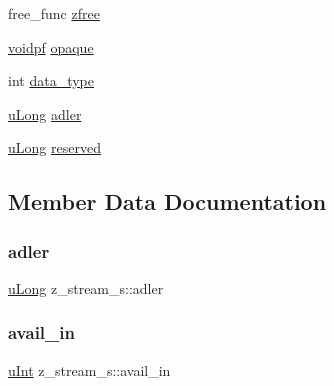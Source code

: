 \begin{DoxyCompactItemize}
\item 
free\+\_\+func \mbox{\hyperlink{structz__stream__s_a89eb750ade7f4f0b56bfdadf13344982}{zfree}}
\item 
\mbox{\hyperlink{ZlibCrc32_8h_a04c731495379021454c8e61439dc88ec}{voidpf}} \mbox{\hyperlink{structz__stream__s_ab72467f908d2ce65d5b42ee6556ef8bb}{opaque}}
\item 
int \mbox{\hyperlink{structz__stream__s_a9d8f63877d7639a8bca60f9fc3704fc4}{data\+\_\+type}}
\item 
\mbox{\hyperlink{ZlibCrc32_8h_acd2a5701a3aecf6700d2c66c606ecb40}{u\+Long}} \mbox{\hyperlink{structz__stream__s_ade2217fe31e671be1257731883201223}{adler}}
\item 
\mbox{\hyperlink{ZlibCrc32_8h_acd2a5701a3aecf6700d2c66c606ecb40}{u\+Long}} \mbox{\hyperlink{structz__stream__s_add73791dd19b49c9c68f3f3d328c37db}{reserved}}
\end{DoxyCompactItemize}


\subsection{Member Data Documentation}
\mbox{\label{structz__stream__s_ade2217fe31e671be1257731883201223}} 
\subsubsection{\texorpdfstring{adler}{adler}}
{\footnotesize\ttfamily \mbox{\hyperlink{ZlibCrc32_8h_acd2a5701a3aecf6700d2c66c606ecb40}{u\+Long}} z\+\_\+stream\+\_\+s\+::adler}

\mbox{\label{structz__stream__s_a0cf177f50dbb49692f27480cbcfde794}} 
\subsubsection{\texorpdfstring{avail\+\_\+in}{avail\_in}}
{\footnotesize\ttfamily \mbox{\hyperlink{ZlibCrc32_8h_a87d141052bcd5ec8a80812a565c70369}{u\+Int}} z\+\_\+stream\+\_\+s\+::avail\+\_\+in}

\mbox{\label{structz__stream__s_a45ad2364307af9d944fd39d4eca3ca3c}} 
